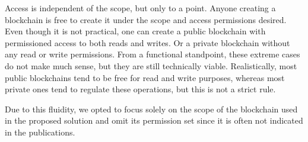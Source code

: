 \documentclass[../access.tex]{subfiles}
\begin{document}
Access is independent of the scope, but only to a point. Anyone creating a blockchain is free to create it under the scope and access permissions desired. Even though it is not practical, one can create a public blockchain with permissioned access to both reads and writes. Or a private blockchain without any read or write permissions. From a functional standpoint, these extreme cases do not make much sense, but they are still technically viable. Realistically, most public blockchains tend to be free for read and write purposes, whereas most private ones tend to regulate these operations, but this is not a strict rule.
\par
Due to this fluidity, we opted to focus solely on the scope of the blockchain used in the proposed solution and omit its permission set since it is often not indicated in the publications.
\end{document}
